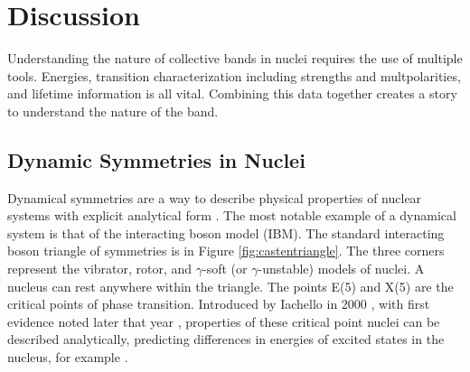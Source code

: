 %
%
%
%
%
%
%
%
%
%


%
%

\chapter{Discussion}

Understanding the nature of collective bands in nuclei requires the use of multiple tools. Energies, transition characterization including strengths and multpolarities, and lifetime information is all vital. Combining this data together creates a story to understand the nature of the band.

\section{Dynamic Symmetries in Nuclei}

Dynamical symmetries are a way to describe physical properties of nuclear systems with explicit analytical form \citep{iachello00:_x5}. The most notable example of a dynamical system is that of the interacting boson model (IBM). The standard interacting boson triangle of symmetries is in Figure \ref{fig:castentriangle}. The three corners represent the vibrator, rotor, and $\gamma$-soft (or $\gamma$-unstable) models of nuclei. A nucleus can rest anywhere within the triangle. The points E(5) and X(5) are the critical points of phase transition. Introduced by Iachello in 2000 \citep{iachello00:_x5}, with first evidence noted later that year \citep{casten00:_x5}, properties of these critical point nuclei can be described analytically, predicting differences in energies of excited states in the nucleus, for example \citep{iachello01:_x5}.

